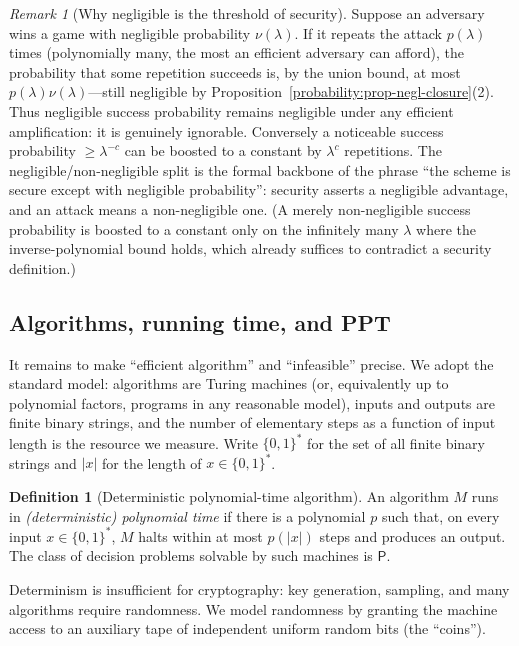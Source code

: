 \documentclass[11pt,a4paper]{article}
\theoremstyle{definition}
\newtheorem{definition}[theorem]{Definition}
\theoremstyle{remark}
\newtheorem{remark}[theorem]{Remark}
\begin{document}
\begin{remark}[Why negligible is the threshold of security]\label{probability:rem-negl}
Suppose an adversary wins a game with negligible probability \(\nu(\lambda)\). If it repeats the attack \(p(\lambda)\) times (polynomially many, the most an efficient adversary can afford), the probability that some repetition succeeds is, by the union bound, at most \(p(\lambda)\nu(\lambda)\)---still negligible by Proposition~\ref{probability:prop-negl-closure}(2). Thus negligible success probability remains negligible under any efficient amplification: it is genuinely ignorable. Conversely a noticeable success probability \(\ge \lambda^{-c}\) can be boosted to a constant by \(\lambda^{c}\) repetitions. The negligible/non-negligible split is the formal backbone of the phrase ``the scheme is secure except with negligible probability'': security asserts a negligible advantage, and an attack means a non-negligible one. (A merely non-negligible success probability is boosted to a constant only on the infinitely many \(\lambda\) where the inverse-polynomial bound holds, which already suffices to contradict a security definition.)
\end{remark}

\subsection{Algorithms, running time, and PPT}

It remains to make ``efficient algorithm'' and ``infeasible'' precise. We adopt the standard model: algorithms are Turing machines (or, equivalently up to polynomial factors, programs in any reasonable model), inputs and outputs are finite binary strings, and the number of elementary steps as a function of input length is the resource we measure. Write \(\{0,1\}^*\) for the set of all finite binary strings and \(|x|\) for the length of \(x \in \{0,1\}^*\).

\begin{definition}[Deterministic polynomial-time algorithm]\label{probability:def-pt}
An algorithm \(M\) runs in \emph{(deterministic) polynomial time} if there is a polynomial \(p\) such that, on every input \(x \in \{0,1\}^*\), \(M\) halts within at most \(p(|x|)\) steps and produces an output. The class of decision problems solvable by such machines is \(\mathsf{P}\).
\end{definition}

Determinism is insufficient for cryptography: key generation, sampling, and many algorithms require randomness. We model randomness by granting the machine access to an auxiliary tape of independent uniform random bits (the ``coins'').
\end{document}
